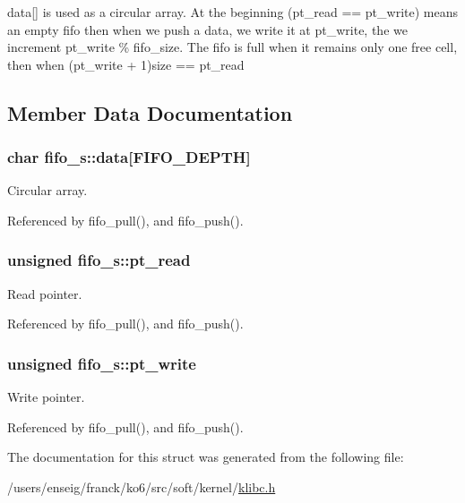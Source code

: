 data\mbox{[}\mbox{]} is used as a circular array. At the beginning (pt\-\_\-read == pt\-\_\-write) means an empty fifo then when we push a data, we write it at pt\-\_\-write, the we increment pt\-\_\-write \% fifo\-\_\-size. The fifo is full when it remains only one free cell, then when (pt\-\_\-write + 1)size == pt\-\_\-read 

\subsection{Member Data Documentation}
\hypertarget{structfifo__s_a404947915e9c75b5cbbd89187eb80af5}{
\subsubsection[{data}]{\setlength{\rightskip}{0pt plus 5cm}char fifo\-\_\-s\-::data\mbox{[}{\bf F\-I\-F\-O\-\_\-\-D\-E\-P\-T\-H}\mbox{]}}}\label{structfifo__s_a404947915e9c75b5cbbd89187eb80af5}


Circular array. 



Referenced by fifo\-\_\-pull(), and fifo\-\_\-push().

\hypertarget{structfifo__s_a19b8017ce5eae056136497331734326c}{
\subsubsection[{pt\-\_\-read}]{\setlength{\rightskip}{0pt plus 5cm}unsigned fifo\-\_\-s\-::pt\-\_\-read}}\label{structfifo__s_a19b8017ce5eae056136497331734326c}


Read pointer. 



Referenced by fifo\-\_\-pull(), and fifo\-\_\-push().

\hypertarget{structfifo__s_a32bc3dae5f99ee248fae7d2fde0f2a46}{
\subsubsection[{pt\-\_\-write}]{\setlength{\rightskip}{0pt plus 5cm}unsigned fifo\-\_\-s\-::pt\-\_\-write}}\label{structfifo__s_a32bc3dae5f99ee248fae7d2fde0f2a46}


Write pointer. 



Referenced by fifo\-\_\-pull(), and fifo\-\_\-push().



The documentation for this struct was generated from the following file\-:\begin{DoxyCompactItemize}
\item 
/users/enseig/franck/ko6/src/soft/kernel/\hyperlink{klibc_8h}{klibc.\-h}\end{DoxyCompactItemize}

